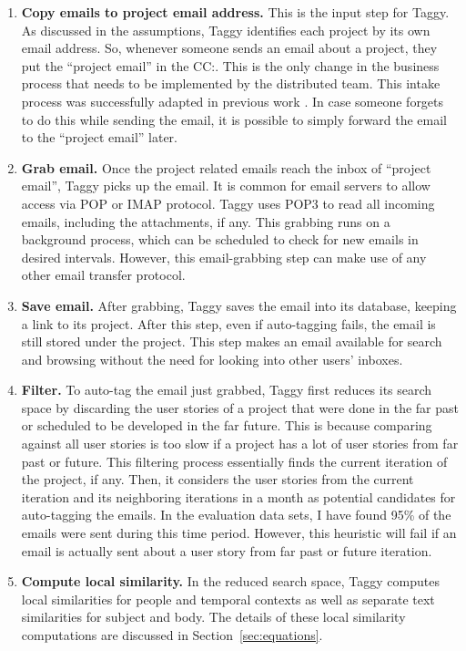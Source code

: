\begin{enumerate}
	\item \textbf{Copy emails to project email address.} This is the input step for Taggy. As discussed in the assumptions, Taggy identifies each project by its own email address. So, whenever someone sends an email about a project, they put the ``project email'' in the CC:. This is the only change in the business process that needs to be implemented by the distributed team. This intake process was successfully adapted in previous work \cite{where_did_you}. In case someone forgets to do this while sending the email, it is possible to simply forward the email to the ``project email'' later.
	
	\item \textbf{Grab email.} Once the project related emails reach the inbox of ``project email'', Taggy picks up the email. It is common for email servers to allow access via POP or IMAP protocol. Taggy uses POP3 to read all incoming emails, including the attachments, if any. This grabbing runs on a background process, which can be scheduled to check for new emails in desired intervals. However, this email-grabbing step can make use of any other email transfer protocol.

	\item \textbf{Save email.} After grabbing, Taggy saves the email into its database, keeping a link to its project. After this step, even if auto-tagging fails, the email is still stored under the project. This step makes an email available for search and browsing without the need for looking into other users' inboxes.
	
	\item \textbf{Filter.} To auto-tag the email just grabbed, Taggy first reduces its search space by discarding the user stories of a project that were done in the far past or scheduled to be developed in the far future. This is because comparing against all user stories is too slow if a project has a lot of user stories from far past or future. This filtering process essentially finds the current iteration of the project, if any. Then, it considers the user stories from the current iteration and its neighboring iterations in a month as potential candidates for auto-tagging the emails. In the evaluation data sets, I have found 95\% of the emails were sent during this time period. However, this heuristic will fail if an email is actually sent about a user story from far past or future iteration.

	\item \textbf{Compute local similarity.} In the reduced search space, Taggy computes local similarities for people and temporal contexts as well as separate text similarities for subject and body. The details of these local similarity computations are discussed in Section~\ref{sec:equations}.
	

\end{enumerate}
